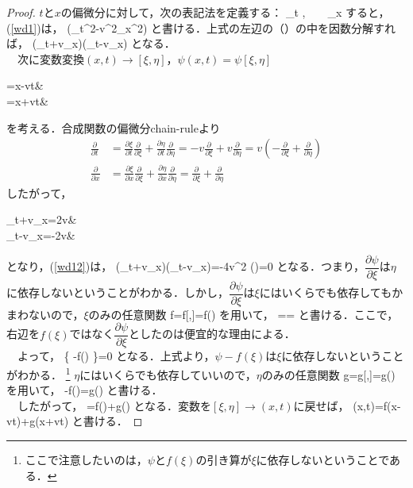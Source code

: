 %
\begin{proof}
$t$と$x$の偏微分に対して，次の表記法を定義する：
\be
\partial_t\equiv{}
,\ \ \ \ 
\partial_x\equiv{}
\ee
すると，(\ref{wd1})は，
\be
(\partial_t^2-v^2\partial_x^2)
\ee
と書ける．上式の左辺の（）の中を因数分解すれば，
\be\label{wd12}
(\partial_t+v\partial_x)(\partial_t-v\partial_x)
\ee
となる．\\
　次に変数変換$(x,t)\to[\xi,\eta]$，$\psi(x,t)=\psi[\xi,\eta]$
\begin{subnumcases}
  {}
  \xi=x-vt& \\
  \eta=x+vt&
\end{subnumcases}
を考える．合成関数の偏微分chain-ruleより
\begin{align}
\frac{\partial}{\partial t}
&=\frac{\partial\xi}{\partial t}\frac{\partial}{\partial \xi}+\frac{\partial\eta}{\partial t}\frac{\partial}{\partial\eta}
=-v\frac{\partial}{\partial \xi}+v\frac{\partial}{\partial\eta}
=v\left(-\frac{\partial}{\partial \xi}+\frac{\partial}{\partial\eta}\right)\\[10pt]
%
\frac{\partial}{\partial x}
&=\frac{\partial\xi}{\partial x}\frac{\partial}{\partial \xi}+\frac{\partial\eta}{\partial x}\frac{\partial}{\partial\eta}
=\frac{\partial}{\partial \xi}+\frac{\partial}{\partial\eta}
\end{align}
したがって，
\begin{subnumcases}
  {}
  \partial_t+v\partial_x=2v\frac{\partial}{\partial \eta}& \\[10pt]
  \partial_t-v\partial_x=-2v\frac{\partial}{\partial \xi}&
\end{subnumcases}
となり，(\ref{wd12})は，
\be
(\partial_t+v\partial_x)(\partial_t-v\partial_x)\psi=-4v^2\frac{\partial}{\partial \eta}\frac{\partial}{\partial \xi}
\ee
\be
\therefore\frac{\partial}{\partial \eta}\left(\frac{\partial\psi}{\partial \xi}\right)=0
\ee
となる．つまり，$\dfrac{\partial\psi}{\partial \xi}$は$\eta$に依存しないということがわかる．しかし，$\dfrac{\partial\psi}{\partial \xi}$は$\xi$にはいくらでも依存してもかまわないので，$\xi$のみの任意関数
\be
f=f[\xi,\eta]=f(\xi)
\ee
を用いて，
\be
\frac{\partial\psi}{\partial \xi}==
\ee
と書ける．ここで，右辺を$f(\xi)$ではなく$\dfrac{\partial\psi}{\partial \xi}$としたのは便宜的な理由による．\\
　よって，
\be
\frac{\partial}{\partial \xi}\left\{
\psi-f(\xi)
\right\}=0
\ee
となる．上式より，$\psi-f(\xi)$は$\xi$に依存しないということがわかる．
\footnote{%
ここで注意したいのは，$\psi$と$f(\xi)$の引き算が$\xi$に依存しないということである．
}
$\eta$にはいくらでも依存していいので，$\eta$のみの任意関数
\be
g=g[\xi,\eta]=g(\eta)
\ee
を用いて，
\be
\psi-f(\xi)=g(\eta)
\ee
と書ける．\\
　したがって，
\be
\psi[\xi,\eta]=f(\xi)+g(\eta)
\ee
となる．変数を$[\xi,\eta]\to(x,t)$に戻せば，
\be
\psi(x,t)=f(x-vt)+g(x+vt)
\ee
と書ける．
\end{proof}
